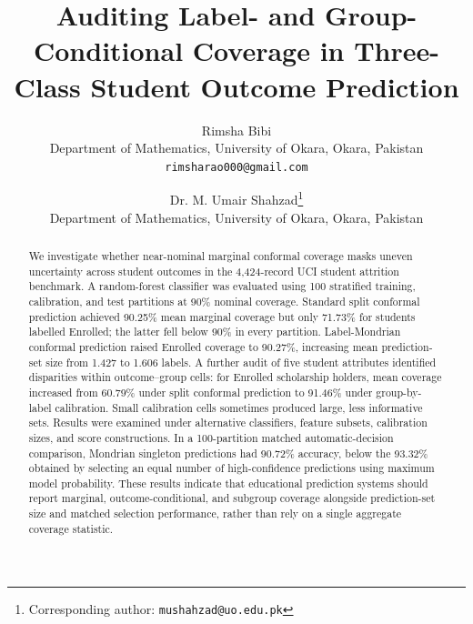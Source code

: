 \theoremstyle{plain}
\newtheorem{theorem}{Theorem}
\newtheorem{lemma}[theorem]{Lemma}
\theoremstyle{definition}
\newtheorem{definition}[theorem]{Definition}
\theoremstyle{remark}
\newtheorem{remark}[theorem]{Remark}

\newcommand{\Prob}{\mathbb{P}}
\newcommand{\Ind}{\mathbf{1}}
\newcommand{\Yset}{\mathcal{Y}}
\newcommand{\qhat}{\hat{q}}
\newcommand{\pihat}{\hat{\pi}}

\title{\bfseries Auditing Label- and Group-Conditional Coverage in Three-Class Student Outcome Prediction}

\author{%
Rimsha Bibi \\
\small Department of Mathematics, University of Okara, Okara, Pakistan \\
\small \texttt{rimsharao000@gmail.com}
\and
Dr. M. Umair Shahzad\thanks{Corresponding author: \texttt{mushahzad@uo.edu.pk}} \\
\small Department of Mathematics, University of Okara, Okara, Pakistan
}
\date{}


\maketitle

\begin{abstract}
We investigate whether near-nominal marginal conformal coverage masks
uneven uncertainty across student outcomes in the 4,424-record UCI student
attrition benchmark. A random-forest classifier was evaluated using 100
stratified training, calibration, and test partitions at 90\% nominal
coverage. Standard split conformal prediction achieved 90.25\% mean
marginal coverage but only 71.73\% for students labelled \textsf{Enrolled};
the latter fell below 90\% in every partition. Label-Mondrian conformal
prediction raised \textsf{Enrolled} coverage to 90.27\%, increasing mean
prediction-set size from 1.427 to 1.606 labels. A further audit of five
student attributes identified disparities within outcome--group cells:
for \textsf{Enrolled} scholarship holders, mean coverage increased from
60.79\% under split conformal prediction to 91.46\% under group-by-label
calibration. Small calibration cells sometimes produced large, less
informative sets. Results were examined under alternative classifiers,
feature subsets, calibration sizes, and score constructions. In a
100-partition matched automatic-decision comparison, Mondrian singleton
predictions had 90.72\% accuracy, below the 93.32\% obtained by selecting
an equal number of high-confidence predictions using maximum model
probability. These results indicate that educational prediction systems
should report marginal, outcome-conditional, and subgroup coverage
alongside prediction-set size and matched selection performance, rather
than rely on a single aggregate coverage statistic.
\end{abstract}

